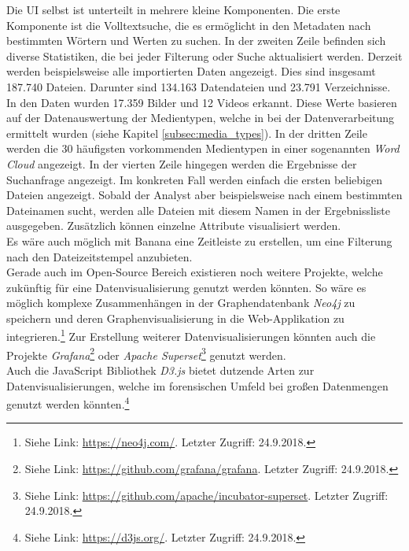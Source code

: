 \noindent
Die UI selbst ist unterteilt in mehrere kleine Komponenten. Die erste Komponente ist die Volltextsuche, die es ermöglicht in den Metadaten nach bestimmten Wörtern und Werten zu suchen. In der zweiten Zeile befinden sich diverse Statistiken, die bei jeder Filterung oder Suche aktualisiert werden. Derzeit werden beispielsweise alle importierten Daten angezeigt. Dies sind insgesamt 187.740 Dateien. Darunter sind 134.163 Datendateien und 23.791 Verzeichnisse. In den Daten wurden 17.359 Bilder und 12 Videos erkannt. Diese Werte basieren auf der Datenauswertung der Medientypen, welche in bei der Datenverarbeitung ermittelt wurden (siehe Kapitel \ref{subsec:media_types}).
In der dritten Zeile werden die 30 häufigsten vorkommenden Medientypen in einer sogenannten \textit{Word Cloud} angezeigt. In der vierten Zeile hingegen werden die Ergebnisse der Suchanfrage angezeigt. Im konkreten Fall werden einfach die ersten beliebigen Dateien angezeigt. Sobald der Analyst aber beispielsweise nach einem bestimmten Dateinamen sucht, werden alle Dateien mit diesem Namen in der Ergebnissliste ausgegeben. Zusätzlich können einzelne Attribute visualisiert werden.\\
Es wäre auch möglich mit Banana eine Zeitleiste zu erstellen, um eine Filterung nach den Dateizeitstempel anzubieten.\\

\noindent
Gerade auch im Open-Source Bereich existieren noch weitere Projekte, welche zukünftig für eine Datenvisualisierung genutzt werden könnten. So wäre es möglich komplexe Zusammenhängen in der Graphendatenbank \textit{Neo4j} zu speichern und deren Graphenvisualisierung in die Web-Applikation zu integrieren.\footnote{Siehe Link: \url{https://neo4j.com/}. Letzter Zugriff: 24.9.2018.} Zur Erstellung weiterer Datenvisualisierungen könnten auch die Projekte \textit{Grafana}\footnote{Siehe Link: \url{https://github.com/grafana/grafana}. Letzter Zugriff: 24.9.2018.} oder \textit{Apache Superset}\footnote{Siehe Link: \url{https://github.com/apache/incubator-superset}. Letzter Zugriff: 24.9.2018.} genutzt werden.\\
Auch die JavaScript Bibliothek \textit{D3.js} bietet dutzende Arten zur Datenvisualisierungen, welche im forensischen Umfeld bei großen Datenmengen genutzt werden könnten.\footnote{Siehe Link: \url{https://d3js.org/}. Letzter Zugriff: 24.9.2018.}\\




